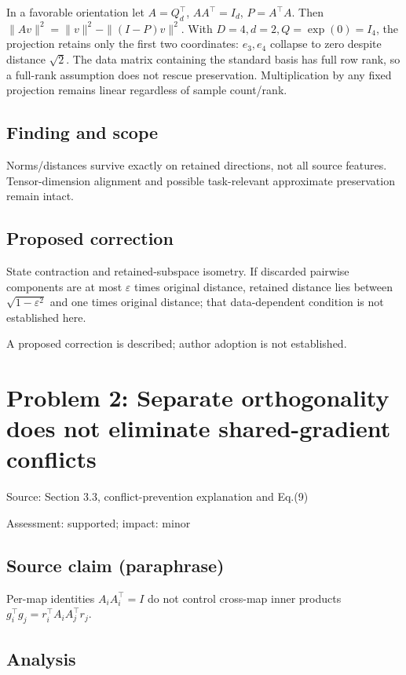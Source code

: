 \documentclass[11pt]{article}
\begin{document}
In a favorable orientation let \(A=Q_d^{\top}\), \(AA^{\top}=I_d\), \(P=A^{\top}A\). Then \(\|Av\|^2=\|v\|^2-\|(I-P)v\|^2\). With \(D=4,d=2,Q=\exp(0)=I_4\), the projection retains only the first two coordinates: \(e_3,e_4\) collapse to zero despite distance \(\sqrt2\). The data matrix containing the standard basis has full row rank, so a full-rank assumption does not rescue preservation. Multiplication by any fixed projection remains linear regardless of sample count/rank.

\subsection*{Finding and scope}

Norms/distances survive exactly on retained directions, not all source features. Tensor-dimension alignment and possible task-relevant approximate preservation remain intact.

\subsection*{Proposed correction}

State contraction and retained-subspace isometry. If discarded pairwise components are at most \(\varepsilon\) times original distance, retained distance lies between \(\sqrt{1-\varepsilon^2}\) and one times original distance; that data-dependent condition is not established here.

A proposed correction is described; author adoption is not established.

\section*{Problem 2: Separate orthogonality does not eliminate shared-gradient conflicts}

Source: Section 3.3, conflict-prevention explanation and Eq.(9)

Assessment: supported; impact: minor

\subsection*{Source claim (paraphrase)}

Per-map identities \(A_iA_i^{\top}=I\) do not control cross-map inner products \(g_i^{\top}g_j=r_i^{\top}A_iA_j^{\top}r_j\).

\subsection*{Analysis}
\end{document}
